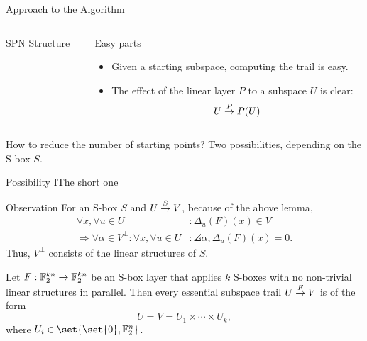 \begin{frame}{Approach to the Algorithm}
\begin{columns}[onlytextwidth]
\begin{column}{0.6\textwidth}
\begin{block}{SPN Structure\vphantom{y}}
                \vspace{0.5em}
            \end{block}
        \end{column}
        \begin{column}{0.3325\textwidth}
            \begin{block}{Easy parts}
                \vspace{4mm}
                \begin{itemize}
                    \item Given a starting subspace, computing the trail is easy.
                    \item The effect of the linear layer $P$ to a subspace $U$ is clear:
                          \begin{equation*}
                              U \stackrel{P}{\rightarrow} P(U)
                          \end{equation*}
                \end{itemize}
                \vspace{4mm}
            \end{block}
        \end{column}
    \end{columns}
    \begin{block}{How to reduce the number of starting points?}
        Two possibilities, depending on the S-box $S$.
    \end{block}
\end{frame}

\begin{frame}{Possibility I}{The short one}
    \begin{block}{Observation}
        \vspace{0.25em}
        For an S-box $S$ and $U \stackrel{S}{\rightarrow} V$, because of the above lemma,
        \begin{align*}
            \forall x, \forall u \in U&: \Delta_u(F)(x) \in V \\
            \Rightarrow \forall \alpha \in V^\perp : \forall x, \forall u \in U &: \angles{\alpha, \Delta_u(F)(x)} = 0.
        \end{align*}
        Thus, $V^\perp$ consists of the linear structures of $S$.
    \end{block}
    \begin{theorem}
        Let $F : \mathbb{F}_2^{kn} \to \mathbb{F}_2^{kn}$ be an S-box layer that applies $k$ S-boxes with no non-trivial linear structures in parallel.
        Then every essential subspace trail $U \stackrel{F}{\rightarrow} V$ is of the form
        \begin{equation*}
            U = V = U_1 \times \cdots \times U_k,
        \end{equation*}
        where $U_i \in \set{\set{0}, \F_2^n}$.
    \end{theorem}
\end{frame}

